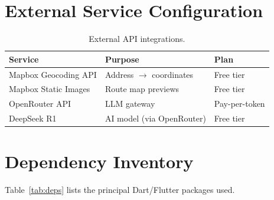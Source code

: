 \section{External Service Configuration}

\begin{table}[H]
\centering
\caption{External API integrations.}
\label{tab:ext-apis}
\begin{tabular}{@{}lll@{}}
\toprule
\textbf{Service} & \textbf{Purpose} & \textbf{Plan}\\
\midrule
Mapbox Geocoding API   & Address $\to$ coordinates & Free tier \\
Mapbox Static Images   & Route map previews       & Free tier \\
OpenRouter API         & LLM gateway              & Pay-per-token \\
DeepSeek R1            & AI model (via OpenRouter) & Free tier \\
\bottomrule
\end{tabular}
\end{table}

\section{Dependency Inventory}

Table~\ref{tab:deps} lists the principal Dart/Flutter packages used.

